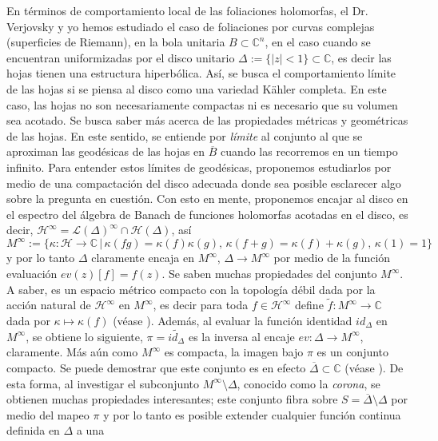 \documentclass{article}
\newcommand{\co}{\ensuremath{\mathbb C }}
\begin{document}
\noindent En t\'erminos de comportamiento local de las foliaciones holomorfas,
el Dr. Verjovsky y yo hemos estudiado el caso de foliaciones por curvas
complejas (superficies de Riemann), en la bola unitaria $B\subset\co^n$, en el
caso cuando se encuentran uniformizadas por el  disco unitario
$\Delta:=\{|z|< 1\}\subset\co$, es decir las hojas tienen una estructura
hiperb\'olica. As\'i, se busca el comportamiento  l\'imite de las hojas si se
piensa al disco como una variedad K\"ahler completa. En este caso, las hojas no
son necesariamente compactas  ni es necesario que su volumen sea acotado. Se
busca saber m\'as acerca de las propiedades m\'etricas y geom\'etricas de las
hojas.  En este sentido, se entiende por \emph{l\'imite} al conjunto al que se
aproximan las geod\'esicas de las hojas en $\overline{B}$ cuando las recorremos
en un tiempo infinito.  Para entender estos l\'imites de geod\'esicas,
proponemos estudiarlos por medio de una compactaci\'on del disco adecuada donde
sea posible esclarecer algo sobre la pregunta en cuesti\'on. Con esto en mente,
proponemos encajar al disco en el espectro  del \'algebra de Banach de funciones
holomorfas acotadas en el disco, es decir,
$\mathcal{H}^{\infty}=\mathcal{L}(\Delta)^{\infty}\cap\mathcal{H}(\Delta)$,
as\'i
\hbox{$M^{\infty}:=\{\kappa:\mathcal{H}\rightarrow\co\,|\,\kappa(fg)=\kappa(f)\kappa(g),\,\kappa(f+g)=\kappa(f)+\kappa(g),\,\kappa(1)=1\}$}
y por lo tanto $\Delta$ claramente encaja  en $M^{\infty}$,
$\Delta\rightarrow M^{\infty}$ por medio de la funci\'on evaluaci\'on
$ev(z)[f]=f(z)$. Se saben muchas propiedades del conjunto $M^{\infty}$. A saber, es un
espacio m\'etrico compacto con la topolog\'ia d\'ebil dada por la acci\'on
natural de $\mathcal{H}^{\infty}$ en $M^{\infty}$, es decir para toda
$f\in\mathcal{H}^{\infty}$ define $\tilde{f}:M^{\infty}\rightarrow\co$ dada por
$\kappa\mapsto\kappa(f)$ (v\'ease \cite{SCHARK}).  Adem\'as, al evaluar la
funci\'on identidad $id_{\Delta}$ en $M^{\infty}$, se obtiene lo siguiente,
$\pi=\tilde{id_{\Delta}}$  es la inversa al encaje
$ev:\Delta\rightarrow M^{\infty}$, claramente.  M\'as a\'un como $M^{\infty}$ es
compacta, la imagen bajo $\pi$ es un conjunto compacto. Se puede demostrar que
este conjunto es en efecto $\overline{\Delta}\subset\co$ (v\'ease
\cite{SCHARK}). De esta forma, al investigar el subconjunto
$M^{\infty}\setminus\Delta$, conocido como  la \emph{corona}, se obtienen muchas
propiedades interesantes; este conjunto fibra sobre
$S=\overline{\Delta}\setminus\Delta$ por medio del mapeo $\pi$  y por lo tanto
es posible extender cualquier funci\'on continua definida en $\Delta$ a una
\end{document}
